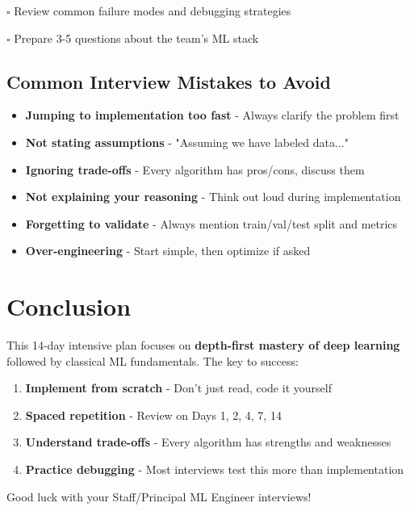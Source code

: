 \documentclass[10pt]{article}
\begin{document}
$\square$ Review common failure modes and debugging strategies

$\square$ Prepare 3-5 questions about the team's ML stack

\subsection{Common Interview Mistakes to Avoid}

\begin{itemize}
\item \textbf{Jumping to implementation too fast} - Always clarify the problem first
\item \textbf{Not stating assumptions} - "Assuming we have labeled data..."
\item \textbf{Ignoring trade-offs} - Every algorithm has pros/cons, discuss them
\item \textbf{Not explaining your reasoning} - Think out loud during implementation
\item \textbf{Forgetting to validate} - Always mention train/val/test split and metrics
\item \textbf{Over-engineering} - Start simple, then optimize if asked
\end{itemize}

\section{Conclusion}

This 14-day intensive plan focuses on \textbf{depth-first mastery of deep learning} followed by classical ML fundamentals. The key to success:

\begin{enumerate}
\item \textbf{Implement from scratch} - Don't just read, code it yourself
\item \textbf{Spaced repetition} - Review on Days 1, 2, 4, 7, 14
\item \textbf{Understand trade-offs} - Every algorithm has strengths and weaknesses
\item \textbf{Practice debugging} - Most interviews test this more than implementation
\end{enumerate}

Good luck with your Staff/Principal ML Engineer interviews!
\end{document}
